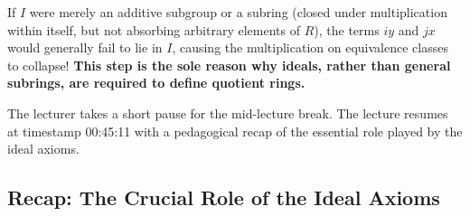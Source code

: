 \begin{content}
\begin{steps}
If $I$ were merely an additive subgroup or a subring (closed under multiplication within itself, but not absorbing arbitrary elements of $R$), the terms $i y$ and $j x$ would generally fail to lie in $I$, causing the multiplication on equivalence classes to collapse! \textbf{This step is the sole reason why ideals, rather than general subrings, are required to define quotient rings.}
\end{steps}
\end{content}

\begin{hidden}
\end{hidden}

\begin{pause}
The lecturer takes a short pause for the mid-lecture break. The lecture resumes at timestamp 00:45:11 with a pedagogical recap of the essential role played by the ideal axioms.
\end{pause}

\subsection{Recap: The Crucial Role of the Ideal Axioms}

